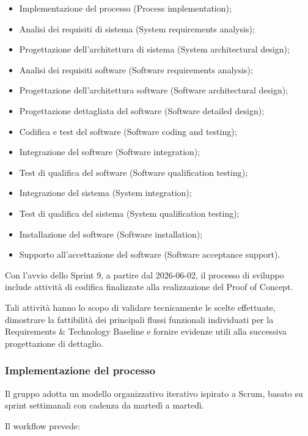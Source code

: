 \begin{itemize}
  \item Implementazione del processo (Process implementation);
  \item Analisi dei requisiti di sistema (System requirements analysis);
  \item Progettazione dell'architettura di sistema (System architectural design);
  \item Analisi dei requisiti software (Software requirements analysis);
  \item Progettazione dell'architettura software (Software architectural design);
  \item Progettazione dettagliata del software (Software detailed design);
  \item Codifica e test del software (Software coding and testing);
  \item Integrazione del software (Software integration);
  \item Test di qualifica del software (Software qualification testing);
  \item Integrazione del sistema (System integration);
  \item Test di qualifica del sistema (System qualification testing);
  \item Installazione del software (Software installation);
  \item Supporto all'accettazione del software (Software acceptance support).
\end{itemize}

Con l'avvio dello Sprint 9, a partire dal 2026-06-02, il processo di sviluppo
include attività di codifica finalizzate alla realizzazione del Proof of
Concept.

Tali attività hanno lo scopo di validare tecnicamente le scelte effettuate,
dimostrare la fattibilità dei principali flussi funzionali individuati per la
Requirements \& Technology Baseline e fornire evidenze utili alla
successiva progettazione di dettaglio.


\subsubsection{Implementazione del processo}

Il gruppo adotta un modello organizzativo iterativo ispirato a Scrum,
basato su sprint settimanali con cadenza da martedì a martedì.

Il workflow prevede:


